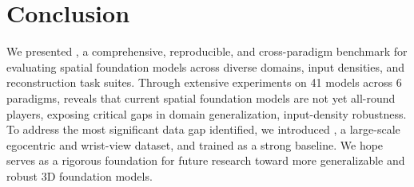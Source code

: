 \section{Conclusion}
We presented \benchmark, a comprehensive, reproducible, and cross-paradigm benchmark for evaluating spatial foundation models across diverse domains, input densities, and reconstruction task suites.
%
Through extensive experiments on 41 models across 6 paradigms, \benchmark reveals that current spatial foundation models are not yet all-round players, exposing critical gaps in domain generalization, input-density robustness.
%
To address the most significant data gap identified, we introduced \dataset, a large-scale egocentric and wrist-view dataset, and trained \ours as a strong baseline.
%
We hope \benchmark serves as a rigorous foundation for future research toward more generalizable and robust 3D foundation models.